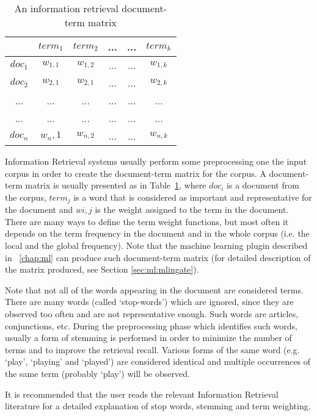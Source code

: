 \begin{table}
\begin{center}
\begin{tabular}{|c|c|c|c|c|c|}
\hline
& $term_1$ & $term_2$ & ... & ... & $term_k$\\
\hline
$doc_1$ & $w_{1,1}$ & $w_{1,2}$ & ... & ... & $w_{1,k}$\\
\hline
$doc_2$ & $w_{2,1}$ & $w_{2,1}$ & ... & ... & $w_{2,k}$\\
\hline
... & ... & ... & ... & ... & ... \\
\hline
... & ... & ... & ... & ... & ... \\
\hline
$doc_n$ & $w{_n,1}$ & $w_{n,2}$ & ... & ... & $w_{n,k}$\\
\hline
\end{tabular}
\caption{An information retrieval document-term matrix}
\label{table:matrix}
\end{center}
\end{table}



Information Retrieval systems usually perform some preprocessing one the input
corpus in order to create the document-term matrix for the corpus. A
document-term matrix is usually presented as in Table~\ref{table:matrix},
where $doc_i$ is a document from the corpus, $term_j$ is a word that is
considered as important and representative for the document and $wi,j$ is the
weight assigned to the term in the document. There are many ways to define the
term weight functions, but most often it depends on the term frequency in the
document and in the whole corpus (i.e. the local and the global
frequency). Note that the machine learning plugin described in
\Chapthing~\ref{chap:ml} can produce such document-term matrix (for detailed
description of the matrix produced, see Section \ref{sec:ml:mlingate}).

Note that not all of the words appearing in the document are
considered terms. There are many words (called `stop-words') which are
ignored, since they are observed too often and are not representative
enough. Such words are articles, conjunctions, etc. During the
preprocessing phase which identifies such words, usually a form of
stemming is performed in order to minimize the number of terms and to
improve the retrieval recall. Various forms of the same word
(e.g. `play', `playing' and `played') are considered identical and
multiple occurrences of the same term (probably `play') will be
observed.

It is recommended that the user reads the relevant Information
Retrieval literature for a detailed explanation of stop words,
stemming and term weighting.


